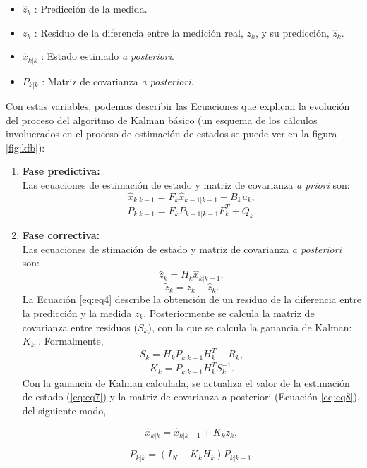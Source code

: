 \begin{itemize}
\item $\hat{z}_k$ : Predicci\'on de la medida.
\item $\tilde{z}_k$ : Residuo de la diferencia entre la medici\'on real, $z_k$, y su predicci\'on, $\hat{z}_k$.
\item $\hat{x}_{k|k}$ : Estado estimado \textit{a posteriori}.
\item $P_{k|k}$ : Matriz de covarianza \textit{a posteriori}.
\end{itemize}
\bigskip

Con estas variables, podemos describir las Ecuaciones que explican la evoluci\'on del proceso del algoritmo de Kalman b\'asico (un esquema de los c\'alculos involucrados en el proceso de estimaci\'on de estados se puede ver en la figura \ref{fig:kfb}):
\begin{enumerate}
\item \textbf{Fase predictiva:}\\
Las ecuaciones de estimaci\'on de estado y matriz de covarianza \textit{a priori} son:
\begin{equation}
\hat{x}_{k|k-1} = F_k \hat{x}_{k-1|k-1} + B_k u_k,
\label{eq:eq1}
\end{equation}
\begin{equation}
P_{k|k-1} = F_{k}P_{k-1|k-1}F_k^{T} + Q_k. 
\label{eq:eq2}
\end{equation}
\item \textbf{Fase correctiva:}\\
Las ecuaciones de stimaci\'on de estado y matriz de covarianza \textit{a posteriori} son:
\begin{equation}
\hat{z}_k = H_{k} \hat{x}_{k|k-1},
\label{eq:eq3}
\end{equation}
\begin{equation}
\tilde{z}_k=z_k - \hat{z}_k.
\label{eq:eq4}
\end{equation}
La Ecuaci\'on \ref{eq:eq4} describe la obtenci\'on de un residuo de la diferencia entre la predicci\'on y la medida $z_k$. Posteriormente se calcula la matriz de covarianza entre residuos ($S_k$), con la que se calcula la ganancia de Kalman: $K_k$ . Formalmente,
\begin{equation}
S_k = H_k P_{k|k-1} H_{k}^T + R_k,
\label{eq:eq5}
\end{equation}
\begin{equation}
K_k = P_{k|k-1} H_k^T S_k^{-1}.
\label{eq:eq6}
\end{equation}
Con la ganancia de Kalman calculada, se actualiza el valor de la estimaci\'on de estado (\ref{eq:eq7}) y la matriz de covarianza a posteriori (Ecuaci\'on \ref{eq:eq8}), del siguiente modo, 

\begin{equation}
\hat{x}_{k|k} = \hat{x}_{k|k-1} + K_k \tilde{z}_k,
\label{eq:eq7}
\end{equation}

\begin{equation}
P_{k|k} = (I_N - K_kH_k)P_{k|k-1}.
\label{eq:eq8}
\end{equation}
\bigskip

\end{enumerate}
